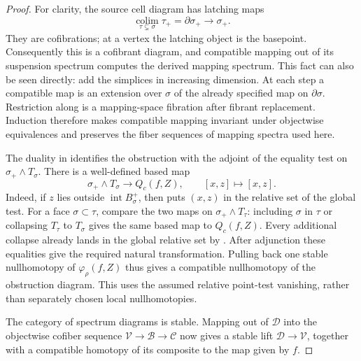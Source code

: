 \begin{proof}
For clarity, the source cell diagram has latching maps
\begin{equation}\label{eq:cell-latching}
 \underset{\tau\subsetneq\sigma}{\operatorname{colim}}\tau_+
 =\partial\sigma_+\longrightarrow\sigma_+.
\end{equation}
They are cofibrations; at a vertex the latching object is the basepoint.
Consequently this is a cofibrant diagram, and compatible mapping out
of its suspension spectrum computes the derived mapping spectrum.
This fact can also be seen directly: add the simplices in increasing
dimension.  At each step a compatible map is an extension over
$\sigma$ of the already specified map on $\partial\sigma$.
Restriction along  is a mapping-space fibration
after fibrant replacement.  Induction therefore makes compatible
mapping invariant under objectwise equivalences and preserves the
fiber sequences of mapping spectra used here.

The duality in  identifies the obstruction with
the adjoint of the equality test on $\sigma_+\wedge T_\sigma$.
There is a well-defined based map
\begin{equation}\label{eq:local-to-global-test}
 \sigma_+\wedge T_\sigma\longrightarrow Q_c(f,Z),
 \qquad [x,z]\longmapsto[x,z].
\end{equation}
Indeed, if $z$ lies outside $\operatorname{int}B_\sigma^+$, then
 puts $(x,z)$ in the relative set of
the global test.  For a face $\sigma\subset\tau$, compare the two
maps on $\sigma_+\wedge T_\tau$: including $\sigma$ in $\tau$ or
collapsing $T_\tau$ to $T_\sigma$ gives the same based map to
$Q_c(f,Z)$.
Every additional collapse already lands in the global relative set by
.  After adjunction these equalities
give the required natural transformation.  Pulling back one stable nullhomotopy of
$\varphi_\rho(f,Z)$ thus gives a compatible nullhomotopy of the
obstruction diagram.  This uses the assumed relative point-test
vanishing, rather than separately chosen local nullhomotopies.

The category of spectrum diagrams is stable.  Mapping out of
$\mathcal D$ into the objectwise cofiber sequence
$\mathcal V\to\mathcal B\to\mathcal C$ now gives a stable lift
$\mathcal D\to\mathcal V$, together with a compatible homotopy of its
composite to the map given by $f$.


\end{proof}
